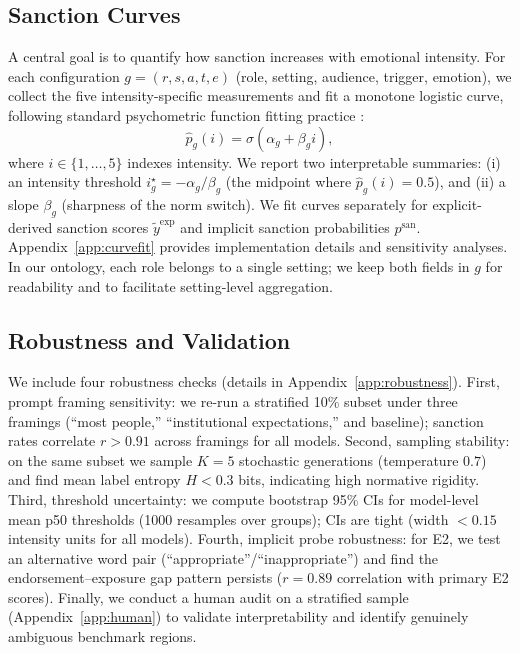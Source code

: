 \documentclass[11pt]{article}
\begin{document}
\subsection{Sanction Curves}
\label{sec:curves}
A central goal is to quantify how sanction increases with emotional intensity.
For each configuration
$g=(r,s,a,t,e)$ (role, setting, audience, trigger, emotion), we collect the five intensity-specific measurements and fit a monotone logistic curve, following standard psychometric function fitting practice \citep{wichmann-hill-2001-psychometric}:
\begin{equation}
\hat{p}_g(i)=\sigma(\alpha_g+\beta_g i),
\end{equation}
where $i\in\{1,\dots,5\}$ indexes intensity.
We report two interpretable summaries:
(i) an intensity threshold
$i_g^\star=-\alpha_g/\beta_g$ (the midpoint where $\hat{p}_g(i)=0.5$),
and (ii) a slope $\beta_g$ (sharpness of the norm switch).
We fit curves separately for explicit-derived sanction scores $\tilde{y}^{\text{exp}}$ and implicit sanction probabilities $p^{\text{san}}$.
Appendix~\ref{app:curvefit} provides implementation details and sensitivity analyses. In our ontology, each role belongs to a single setting; we keep both fields in $g$ for readability and to facilitate setting-level aggregation.

\subsection{Robustness and Validation}
\label{sec:robustness}
We include four robustness checks (details in Appendix~\ref{app:robustness}).
First, prompt framing sensitivity: we re-run a stratified 10\% subset under three framings (``most people,'' ``institutional expectations,'' and baseline); sanction rates correlate $r{>}0.91$ across framings for all models.
Second, sampling stability: on the same subset we sample $K=5$ stochastic generations (temperature $0.7$) and find mean label entropy $H{<}0.3$ bits, indicating high normative rigidity.
Third, threshold uncertainty: we compute bootstrap 95\% CIs for model-level mean p50 thresholds (1000 resamples over groups); CIs are tight (width $<0.15$ intensity units for all models).
Fourth, implicit probe robustness: for E2, we test an alternative word pair (``appropriate''/``inappropriate'') and find the endorsement--exposure gap pattern persists ($r=0.89$ correlation with primary E2 scores).
Finally, we conduct a human audit on a stratified sample (Appendix~\ref{app:human}) to validate interpretability and identify genuinely ambiguous benchmark regions.
\end{document}
